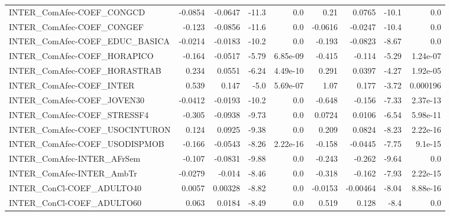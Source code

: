 \begin{tabular}{lrrrrrrrr}
INTER\_ComAfec-COEF\_CONGCD             &     -0.0854 &      -0.0647 &    -11.3 &      0.0 &       0.21 &      0.0765 &        -10.1 &           0.0 \\
INTER\_ComAfec-COEF\_CONGEF             &      -0.123 &      -0.0856 &    -11.6 &      0.0 &    -0.0616 &     -0.0247 &        -10.4 &           0.0 \\
INTER\_ComAfec-COEF\_EDUC\_BASICA        &     -0.0214 &      -0.0183 &    -10.2 &      0.0 &     -0.193 &     -0.0823 &        -8.67 &           0.0 \\
INTER\_ComAfec-COEF\_HORAPICO           &      -0.164 &      -0.0517 &    -5.79 & 6.85e-09 &     -0.415 &      -0.114 &        -5.29 &      1.24e-07 \\
INTER\_ComAfec-COEF\_HORASTRAB          &       0.234 &       0.0551 &    -6.24 & 4.49e-10 &      0.291 &      0.0397 &        -4.27 &      1.92e-05 \\
INTER\_ComAfec-COEF\_INTER              &       0.539 &        0.147 &     -5.0 & 5.69e-07 &       1.07 &       0.177 &        -3.72 &      0.000196 \\
INTER\_ComAfec-COEF\_JOVEN30            &     -0.0412 &      -0.0193 &    -10.2 &      0.0 &     -0.648 &      -0.156 &        -7.33 &      2.37e-13 \\
INTER\_ComAfec-COEF\_STRESSF4           &      -0.305 &      -0.0938 &    -9.73 &      0.0 &     0.0724 &      0.0106 &        -6.54 &      5.98e-11 \\
INTER\_ComAfec-COEF\_USOCINTURON        &       0.124 &       0.0925 &    -9.38 &      0.0 &      0.209 &      0.0824 &        -8.23 &      2.22e-16 \\
INTER\_ComAfec-COEF\_USODISPMOB         &      -0.166 &      -0.0543 &    -8.26 & 2.22e-16 &     -0.158 &     -0.0445 &        -7.75 &       9.1e-15 \\
INTER\_ComAfec-INTER\_AFrSem            &      -0.107 &      -0.0831 &    -9.88 &      0.0 &     -0.243 &      -0.262 &        -9.64 &           0.0 \\
INTER\_ComAfec-INTER\_AmbTr             &     -0.0279 &       -0.014 &    -8.46 &      0.0 &     -0.318 &      -0.162 &        -7.93 &      2.22e-15 \\
INTER\_ConCl-COEF\_ADULTO40             &      0.0057 &      0.00328 &    -8.82 &      0.0 &    -0.0153 &    -0.00464 &        -8.04 &      8.88e-16 \\
INTER\_ConCl-COEF\_ADULTO60             &       0.063 &       0.0184 &    -8.49 &      0.0 &      0.519 &       0.128 &         -8.4 &           0.0 \\

\end{tabular}
